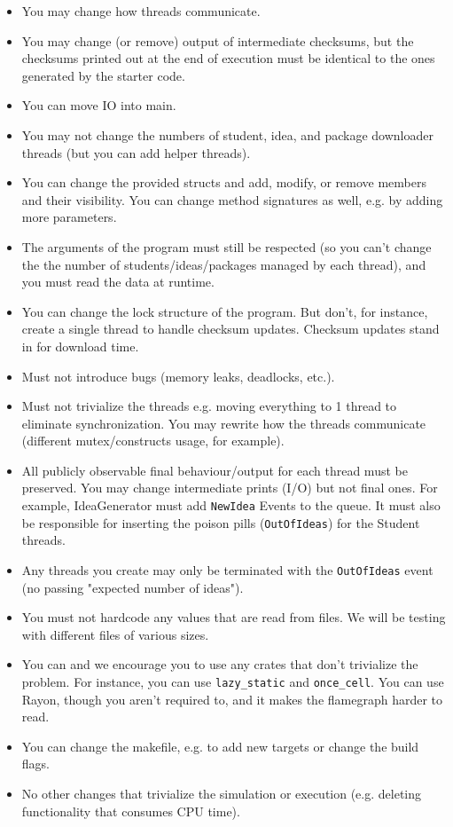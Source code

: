\begin{itemize}
	\item You may change how threads communicate.
	\item You may change (or remove) output of intermediate checksums, but the checksums printed out at the end of execution must be identical to the ones generated by the starter code.
        \item You can move IO into main.
	\item You may not change the numbers of student, idea, and package downloader threads (but you can add helper threads).
        \item You can change the provided structs and add, modify, or remove members and their visibility. You can change method signatures as well, e.g. by adding more parameters.
	\item The arguments of the program must still be respected (so you can't change the the number of students/ideas/packages managed by each thread), and you must read the data at runtime.
        \item You can change the lock structure of the program. But don't, for instance, create a single thread to handle checksum updates. Checksum updates stand in for download time.
	\item Must not introduce bugs (memory leaks, deadlocks, etc.). 
	\item Must not trivialize the threads e.g. moving everything to 1 thread to eliminate synchronization. You may rewrite how the threads communicate (different mutex/constructs usage, for example).
	\item All publicly observable final behaviour/output for each thread must be preserved.  You may change intermediate prints (I/O) but not final ones. For example, IdeaGenerator must add \texttt{NewIdea} Events to the queue. It must also be responsible for inserting the poison pills (\texttt{OutOfIdeas}) for the Student threads.
	\item Any threads you create may only be terminated with the \texttt{OutOfIdeas} event (no passing "expected number of ideas").
	\item You must not hardcode any values that are read from files. We will be testing with different files of various sizes.
        \item You can and we encourage you to use any crates that don't trivialize the problem. For instance, you can use \texttt{lazy\_static} and \texttt{once\_cell}. You can use Rayon, though you aren't required to, and it makes the flamegraph harder to read.
        \item You can change the makefile, e.g. to add new targets or change the build flags.
	\item No other changes that trivialize the simulation or execution (e.g. deleting functionality that consumes CPU time). 
\end{itemize}

